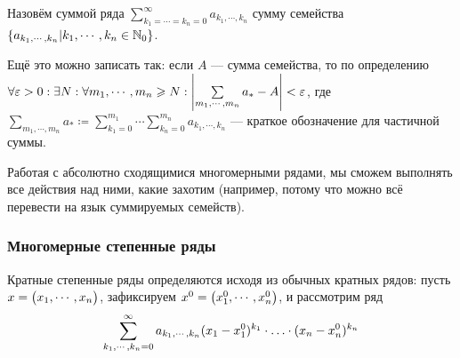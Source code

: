 \documentclass[a4paper]{report}
\begin{document}
    Назовём суммой ряда $\sum\limits_{k_1 = \cdots = k_n = 0}^{\infty}a_{k_1, \cdots, k_n}$ сумму семейства $\left\{a_{k_1, \cdots, k_n}\middle|k_1, \cdots, k_n \in \mathbb{N}_{0}\right\}$.

    Ещё это можно записать так: если $A$ --- сумма семейства, то по определению $\forall \varepsilon > 0: \exists N: \forall m_1, \cdots, m_n \geqslant N: \left|\sum\limits_{m_1, \cdots, m_n}a_{*} - A\right| < \varepsilon$, где $\sum\limits_{m_1, \cdots, m_n}a_{*} \coloneqq \sum\limits_{k_1 = 0}^{m_1} \cdots \sum\limits_{k_n = 0}^{m_n}a_{k_1, \cdots, k_n}$ --- краткое обозначение для частичной суммы.

    Работая с абсолютно сходящимися многомерными рядами, мы сможем выполнять все действия над ними, какие захотим (например, потому что можно всё перевести на язык суммируемых семейств).

    \subsubsection{Многомерные степенные ряды}
    Кратные степенные ряды определяются исходя из обычных кратных рядов: пусть $x = \begin{pmatrix}x_1, \cdots, x_n\end{pmatrix}$, зафиксируем $x^0 = \begin{pmatrix}x_1^0, \cdots, x_n^0\end{pmatrix}$, и рассмотрим ряд
    \[\sum\limits_{k_1, \cdots, k_n = 0}^{\infty}a_{k_1, \cdots, k_n}(x_1 - x_1^0)^{k_1} \cdot\ldots\cdot (x_n - x_n^0)^{k_n}\]
\end{document}
